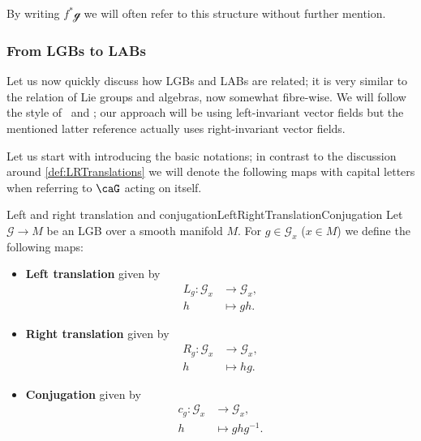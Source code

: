 \documentclass[reqno,a4paper,oneside]{amsart}
\theoremstyle{plain}
\theoremstyle{remark}
\theoremstyle{definition}
\begin{document}
By writing $f^*\mathcal{g}$ we will often refer to this structure without further mention.

\subsubsection{From LGBs to LABs}

Let us now quickly discuss how LGBs and LABs are related; it is very similar to the relation of Lie groups and algebras, now somewhat fibre-wise. We will follow the style of \cite[\S 1.5.2, page 40ff.]{Hamilton}\ and \cite[\S 3.5, page 119ff.]{mackenzieGeneralTheory}; our approach will be using left-invariant vector fields but the mentioned latter reference actually uses right-invariant vector fields.

Let us start with introducing the basic notations; in contrast to the discussion around \ref{def:LRTranslations} we will denote the following maps with capital letters when referring to $\caG$ acting on itself.

\begin{definitions}{Left and right translation and conjugation}{LeftRightTranslationConjugation}
Let $\mathcal{G} \to M$ be an LGB over a smooth manifold $M$. For $g \in \mathcal{G}_x$ ($x \in M$) we define the following maps:
\begin{itemize}
	\item \textbf{Left translation} given by
		\begin{align*}
			L_g: \mathcal{G}_x &\to \mathcal{G}_x,\\
			h &\mapsto g h.
		\end{align*}
	\item \textbf{Right translation} given by
		\begin{align*}
			R_g: \mathcal{G}_x &\to \mathcal{G}_x,\\
			h &\mapsto h g.
		\end{align*}
	\item \textbf{Conjugation} given by
		\begin{align*}
			c_g: \mathcal{G}_x &\to \mathcal{G}_x,\\
			h &\mapsto g h g^{-1}.
		\end{align*}
\end{itemize}
\end{definitions}
\end{document}
